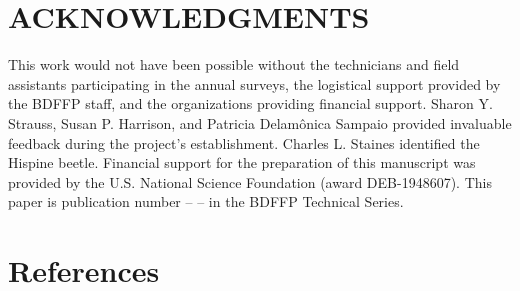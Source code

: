\documentclass[
  man, donotrepeattitle,floatsintext]{apa6}
\begin{document}
\hypertarget{acknowledgments}{%
\section{ACKNOWLEDGMENTS}\label{acknowledgments}}

\noindent  
This work would not have been possible without the technicians and field assistants participating in the annual surveys, the logistical support provided by the BDFFP staff, and the organizations providing financial support. Sharon Y. Strauss, Susan P. Harrison, and Patricia Delamônica Sampaio provided invaluable feedback during the project's establishment. Charles L. Staines identified the Hispine beetle. Financial support for the preparation of this manuscript was provided by the U.S. National Science Foundation (award DEB-1948607). This paper is publication number -- -- in the BDFFP Technical Series.

\newpage

\hypertarget{references}{%
\section{References}\label{references}}

\begingroup
\setlength{\parindent}{0in}
\setlength{\leftskip}{0in}
\end{document}

